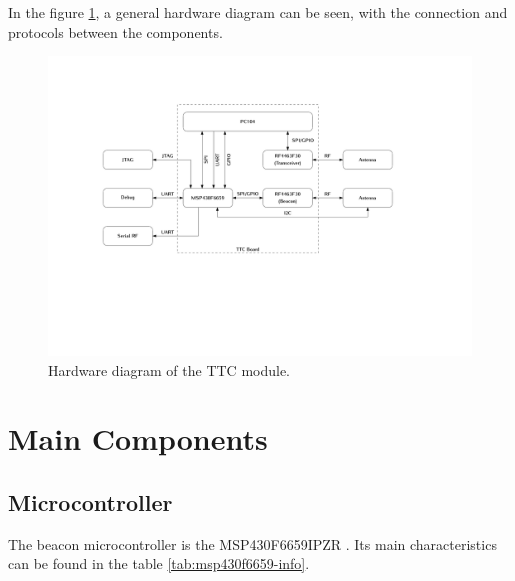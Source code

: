 In the figure \ref{fig:hardware-diagram}, a general hardware diagram can be seen, with the connection and protocols between the components.

\begin{figure}[!h]
	\begin{center}
		\includegraphics[width=\textwidth]{figures/hardware_diagram.pdf}
		\caption{Hardware diagram of the TTC module.}
		\label{fig:hardware-diagram}
	\end{center}
\end{figure}

\section{Main Components}

\subsection{Microcontroller}

The beacon microcontroller is the MSP430F6659IPZR \cite{msp430f6659}. Its main characteristics can be found in the table \ref{tab:msp430f6659-info}.


